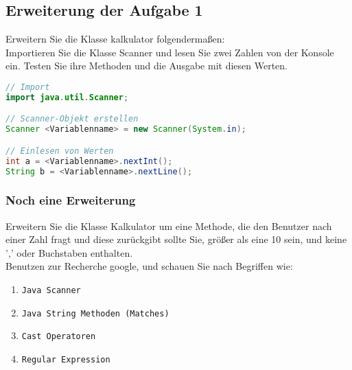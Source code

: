 \documentclass[12pt, a4paper]{article}
\begin{document}
\subsection*{Erweiterung der Aufgabe 1}
Erweitern Sie die Klasse kalkulator folgendermaßen:\\
Importieren Sie die Klasse Scanner und lesen Sie zwei Zahlen von der Konsole ein. Testen Sie ihre Methoden und die Ausgabe mit diesen Werten.
\begin{lstlisting}[language=java,title=Import einer Klasse]
// Import
import java.util.Scanner;

// Scanner-Objekt erstellen
Scanner <Variablenname> = new Scanner(System.in);

// Einlesen von Werten
int a = <Variablenname>.nextInt();
String b = <Variablenname>.nextLine();
\end{lstlisting}
\subsubsection*{Noch eine Erweiterung}
Erweitern Sie die Klasse Kalkulator um eine Methode, die den Benutzer nach einer Zahl fragt und diese zurückgibt sollte Sie, größer als eine 10 sein, und keine ',' oder Buchstaben enthalten.\\
Benutzen zur Recherche google, und schauen Sie nach Begriffen wie:
\begin{enumerate}
    \item \texttt{Java Scanner}
    \item \texttt{Java String Methoden (Matches)}
    \item \texttt{Cast Operatoren}
    \item \texttt{Regular Expression}
\end{enumerate}
\end{document}
